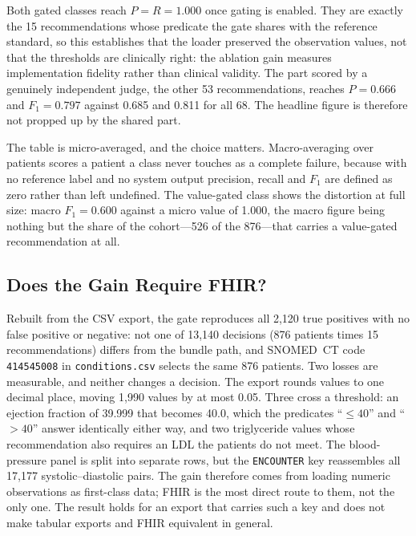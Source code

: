 \documentclass[conference]{IEEEtran}
\begin{document}
Both gated classes reach $P = R = 1.000$ once gating is enabled. They are exactly the 15
recommendations whose predicate the gate shares with the reference standard, so this
establishes that the loader preserved the observation values, not that the thresholds are
clinically right: the ablation gain measures implementation fidelity rather than clinical
validity. The part scored by a genuinely independent judge, the other 53 recommendations,
reaches $P = 0.666$ and $F_1 = 0.797$ against 0.685 and 0.811 for all 68. The headline
figure is therefore not propped up by the shared part.

The table is micro-averaged, and the choice matters. Macro-averaging over patients scores a
patient a class never touches as a complete failure, because with no reference label and no
system output precision, recall and $F_1$ are defined as zero rather than left undefined.
The value-gated class shows the distortion at full size: macro $F_1 = 0.600$ against a micro
value of 1.000, the macro figure being nothing but the share of the cohort---526 of the
876---that carries a value-gated recommendation at all.

\subsection{Does the Gain Require FHIR?}
Rebuilt from the CSV export, the gate reproduces all 2,120 true positives with no false
positive or negative: not one of 13,140 decisions (876 patients times 15 recommendations)
differs from the bundle path, and SNOMED~CT code \texttt{414545008} in
\texttt{conditions.csv} selects the same 876 patients. Two losses are measurable, and
neither changes a decision. The export rounds values to one decimal place, moving 1,990
values by at most 0.05. Three cross a threshold: an ejection fraction of 39.999 that becomes
40.0, which the predicates ``$\le 40$'' and ``$> 40$'' answer identically either way, and
two triglyceride values whose recommendation also requires an LDL the patients do not meet. The blood-pressure panel is split into separate rows, but the
\texttt{ENCOUNTER} key reassembles all 17,177 systolic--diastolic pairs. The gain therefore
comes from loading numeric observations as first-class data; FHIR is the most direct route
to them, not the only one. The result holds for an export that carries such a key and does
not make tabular exports and FHIR equivalent in general.
\end{document}
